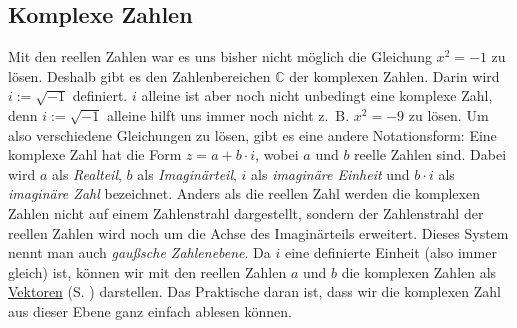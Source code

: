 \documentclass[12pt]{article}
\newcommand{\highlight}[2]{\textcolor{blue}{\hyperref[#1]{#2}} (S. \pageref{#1})}
\begin{document}
	\subsection{Komplexe Zahlen}
		Mit den reellen Zahlen war es uns bisher nicht möglich die Gleichung $x^2=-1$ zu lösen. Deshalb gibt es den Zahlenbereichen $\mathbb{C}$ der komplexen Zahlen. Darin wird $i:=\sqrt{-1}$ definiert. $i$ alleine ist aber noch nicht unbedingt eine komplexe Zahl, denn $i:=\sqrt{-1}$ alleine hilft uns immer noch nicht z.~B. $x^2=-9$ zu lösen. Um also verschiedene Gleichungen zu lösen, gibt es eine andere Notationsform: Eine komplexe Zahl hat die Form $z=a+b\cdot i$, wobei $a$ und $b$ reelle Zahlen sind. Dabei wird $a$ als \textit{Realteil}, $b$ als \textit{Imaginärteil}, $i$ als \textit{imaginäre Einheit} und $b\cdot i$ als \textit{imaginäre Zahl} bezeichnet. Anders als die reellen Zahl werden die komplexen Zahlen nicht auf einem Zahlenstrahl dargestellt, sondern der Zahlenstrahl der reellen Zahlen wird noch um die Achse des Imaginärteils erweitert. Dieses System nennt man auch \textit{gaußsche Zahlenebene}. Da $i$ eine definierte Einheit (also immer gleich) ist, können wir mit den reellen Zahlen $a$ und $b$ die komplexen Zahlen als \highlight{sec:vektorgeometrie}{Vektoren} darstellen. Das Praktische daran ist, dass wir die komplexen Zahl aus dieser Ebene ganz einfach ablesen können.
		\begin{center}
		\end{center}
\end{document}
